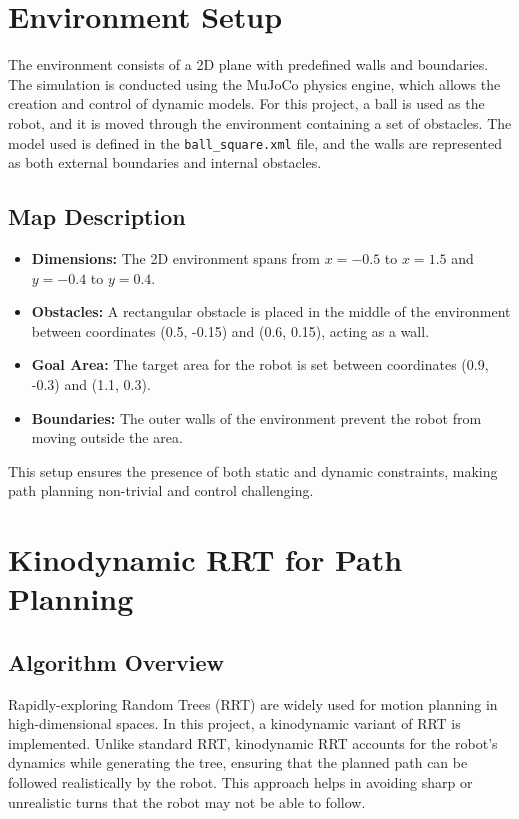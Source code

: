 \documentclass[12pt]{article}
\begin{document}
\section{Environment Setup}
The environment consists of a 2D plane with predefined walls and boundaries. The simulation is conducted using the MuJoCo physics engine, which allows the creation and control of dynamic models. For this project, a ball is used as the robot, and it is moved through the environment containing a set of obstacles. The model used is defined in the \texttt{ball\_square.xml} file, and the walls are represented as both external boundaries and internal obstacles.

\subsection{Map Description}
\begin{itemize}
    \item \textbf{Dimensions:} The 2D environment spans from $x = -0.5$ to $x = 1.5$ and $y = -0.4$ to $y = 0.4$.
    \item \textbf{Obstacles:} A rectangular obstacle is placed in the middle of the environment between coordinates (0.5, -0.15) and (0.6, 0.15), acting as a wall.
    \item \textbf{Goal Area:} The target area for the robot is set between coordinates (0.9, -0.3) and (1.1, 0.3).
    \item \textbf{Boundaries:} The outer walls of the environment prevent the robot from moving outside the area.
\end{itemize}
This setup ensures the presence of both static and dynamic constraints, making path planning non-trivial and control challenging.

\section{Kinodynamic RRT for Path Planning}

\subsection{Algorithm Overview}
Rapidly-exploring Random Trees (RRT) are widely used for motion planning in high-dimensional spaces. In this project, a kinodynamic variant of RRT is implemented. Unlike standard RRT, kinodynamic RRT accounts for the robot’s dynamics while generating the tree, ensuring that the planned path can be followed realistically by the robot. This approach helps in avoiding sharp or unrealistic turns that the robot may not be able to follow.
\end{document}
